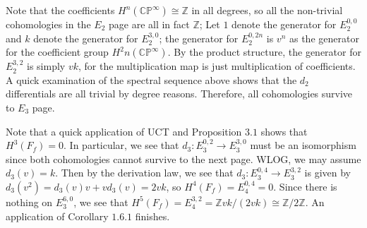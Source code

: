 \documentclass{article}
\theoremstyle{definition}
\theoremstyle{definition}
\theoremstyle{definition}
\theoremstyle{definition}
\theoremstyle{definition}
\theoremstyle{definition}
\theoremstyle{definition}
\begin{document}

Note that the coefficients $H^n(\mathbb{CP}^{\infty})\cong \mathbb{Z}$ in all degrees, so all the non-trivial cohomologies in the $E_2$ page are all in fact $\mathbb{Z}$; Let $1$ denote the generator for $E_2^{0,0}$ and $k$ denote the generator for $E_2^{3,0}$; the generator for $E_2^{0,2n}$ is $v^n$ as the generator for the coefficient group $H^2n(\mathbb{CP}^{\infty})$. By the product structure, the generator for $E_2^{3,2}$ is simply $vk$, for the multiplication map is just multiplication of coefficients.
A quick examination of the spectral sequence above shows that the $d_2$ differentials are all trivial by degree reasons. Therefore, all cohomologies survive to $E_3$ page.

Note that a quick application of UCT and Proposition $3.1$ shows that $H^3(F_f)=0$. In particular, we see that $d_3: E_3^{0,2}\to E_3^{3,0}$ must be an isomorphism since both cohomologies cannot survive to the next page. WLOG, we may assume $d_3(v)=k$. Then by the derivation law, we see that $d_3: E_3^{0,4}\to E_3^{3,2}$ is given by $d_3(v^2)=d_3(v)v+vd_3(v)=2vk$, so $H^4(F_f)=E_4^{0,4}=0$. Since there is nothing on $E_3^{6,0}$, we see that $H^5(F_f)=E_4^{3,2}=\mathbb{Z}vk/(2vk)\cong \mathbb{Z}/2 \mathbb{Z}$. An application of Corollary $1.6.1$ finishes.
\end{document}

